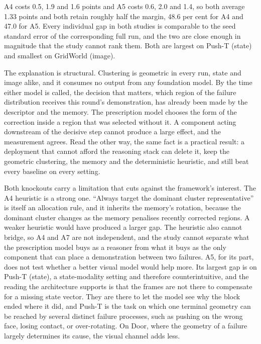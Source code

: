 \documentclass[letterpaper]{article}
\begin{document}
A4 costs 0.5, 1.9 and 1.6 points and A5 costs 0.6, 2.0 and 1.4, so both average 1.33
points and both retain roughly half the margin, 48.6 per cent for A4 and 47.0 for A5.
Every individual gap in both studies is comparable to the seed standard error of the
corresponding full run, and the two are close enough in magnitude that the study cannot
rank them. Both are largest on Push-T (state) and smallest on GridWorld (image).

The explanation is structural. Clustering is geometric in every run, state and image
alike, and it consumes no output from any foundation model. By the time either model is
called, the decision that matters, which region of the failure distribution receives
this round's demonstration, has already been made by the descriptor and the memory. The
prescription model chooses the form of the correction inside a region that was selected
without it. A component acting downstream of the decisive step cannot produce a large
effect, and the measurement agrees. Read the other way, the same fact is a practical
result: a deployment that cannot afford the reasoning stack can delete it, keep the
geometric clustering, the memory and the deterministic heuristic, and still beat every
baseline on every setting.

Both knockouts carry a limitation that cuts against the framework's interest. The A4
heuristic is a strong one. ``Always target the dominant cluster representative'' is itself
an allocation rule, and it inherits the memory's rotation, because the dominant cluster
changes as the memory penalises recently corrected regions. A weaker heuristic would
have produced a larger gap. The heuristic also cannot bridge, so A4 and A7 are not
independent, and the study cannot separate what the prescription model buys as a
reasoner from what it buys as the only component that can place a demonstration between
two failures. A5, for its part, does not test whether a better visual model would help
more. Its largest gap is on Push-T (state), a state-modality setting and therefore
counterintuitive, and the reading the architecture supports is that the frames are not
there to compensate for a missing state vector. They are there to let the model see why
the block ended where it did, and Push-T is the task on which one terminal geometry can
be reached by several distinct failure processes, such as pushing on the wrong face,
losing contact, or over-rotating. On Door, where the geometry of a failure largely
determines its cause, the visual channel adds less.
\end{document}

